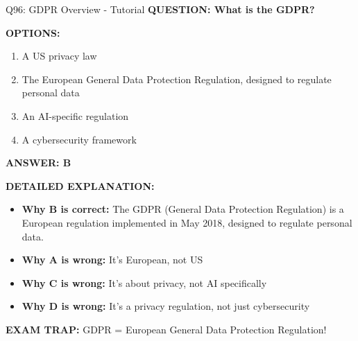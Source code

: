 \documentclass[8pt]{beamer}
\begin{document}
	\begin{frame}{Q96: GDPR Overview - Tutorial}
		\fontsize{6.5}{7.5}\selectfont
		\textbf{QUESTION: What is the GDPR?}
		
		\vspace{0.1cm}
		\textbf{OPTIONS:}
		\begin{enumerate}
			\item A US privacy law
			\item The European General Data Protection Regulation, designed to regulate personal data
			\item An AI-specific regulation
			\item A cybersecurity framework
		\end{enumerate}
		
		\vspace{0.1cm}
		\textcolor{myblue}{\textbf{ANSWER: B}}
		
		\vspace{0.1cm}
		\textbf{DETAILED EXPLANATION:}
		\begin{itemize}
			\item \textbf{Why B is correct:} The GDPR (General Data Protection Regulation) is a European regulation implemented in May 2018, designed to regulate personal data.
			\item \textbf{Why A is wrong:} It's European, not US
			\item \textbf{Why C is wrong:} It's about privacy, not AI specifically
			\item \textbf{Why D is wrong:} It's a privacy regulation, not just cybersecurity
		\end{itemize}
		
		\textcolor{myred}{\textbf{EXAM TRAP:}} GDPR = \textcolor{myblue}{European General Data Protection Regulation}!
	\end{frame}
	
\end{document}
